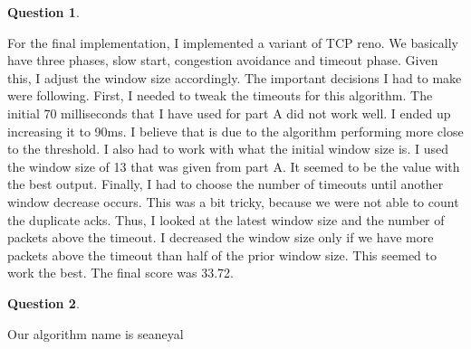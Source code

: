 \documentclass[11pt]{article}
\newtheorem{pb}{Question}
\begin{document}
\begin{pb}
\end{pb}
For the final implementation, I implemented a variant of TCP reno. We basically have three phases, slow start, congestion avoidance and timeout phase. Given this, I adjust the window size accordingly. The important decisions I had to make were following. First, I needed to tweak the timeouts for this algorithm. The initial 70 milliseconds that I have used for part A did not work well. I ended up increasing it to 90ms. I believe that is due to the algorithm performing more close to the threshold. I also had to work with what the initial window size is. I used the window size of 13 that was given from part A. It seemed to be the value with the best output. Finally, I had to choose the number of timeouts until another window decrease occurs. This was a bit tricky, because we were not able to count the duplicate acks. Thus, I looked at the latest window size and the number of packets above the timeout. I decreased the window size only if we have more packets above the timeout than half of the prior window size. This seemed to work the best. The final score was 33.72. 

\begin{pb}
\end{pb}
Our algorithm name is seaneyal
\end{document}
